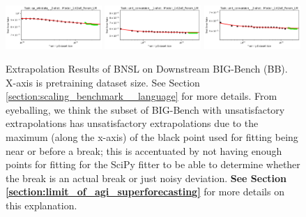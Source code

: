 \documentclass{article} %
\begin{document}
\begin{figure}
\includegraphics[width=0.325\textwidth]{figures/scaling_laws_benchmark_dataset_plots/__qa_wikidata_,__2-shot_____262M.png}
\includegraphics[width=0.325\textwidth]{figures/scaling_laws_benchmark_dataset_plots/__unit_conversion_,__1-shot_____262M.png}
\includegraphics[width=0.325\textwidth]{figures/scaling_laws_benchmark_dataset_plots/__unit_conversion_,__2-shot_____262M.png}

    \caption{
    Extrapolation Results of BNSL on Downstream BIG-Bench (BB). X-axis is pretraining dataset size. See Section \ref{section:scaling_benchmark__language} for more details. From eyeballing, we think the subset of BIG-Bench with unsatisfactory extrapolations has unsatisfactory extrapolations due to the maximum (along the x-axis) of the black point used for fitting being near or before a break; this is accentuated by not having enough points for fitting for the SciPy fitter to be able to determine whether the break is an actual break or just noisy deviation. \textbf{See Section \ref{section:limit_of_agi_superforecasting}} for more details on this explanation.
    }
    \label{fig:scaling_laws_benchmark_dataset__big_bench}
\end{figure}
\end{document}
